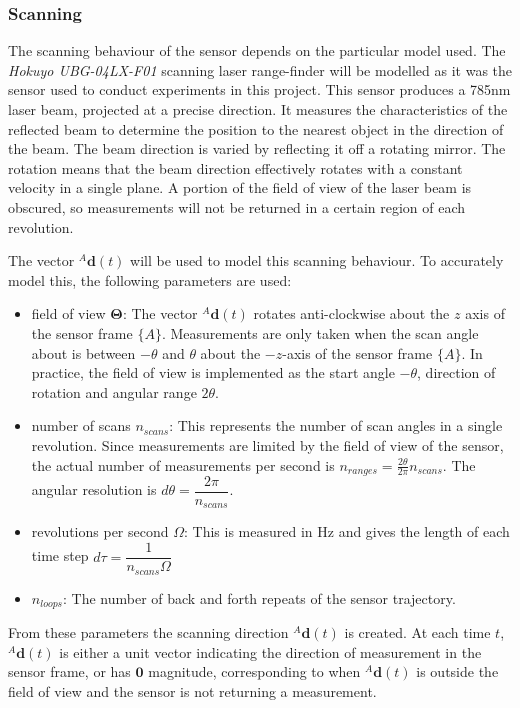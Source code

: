 \subsubsection{Scanning} \label{sec:scanmodel}
The scanning behaviour of the sensor depends on the particular model used. The \textit{Hokuyo UBG-04LX-F01} scanning laser range-finder will be modelled as it was the sensor used to conduct experiments in this project. This sensor produces a 785nm laser beam, projected at a precise direction. It measures the characteristics of the reflected beam to determine the position to the nearest object in the direction of the beam. The beam direction is varied by reflecting it off a rotating mirror. The rotation means that the beam direction effectively rotates with a constant velocity in a single plane. A portion of the field of view of the laser beam is obscured, so measurements will not be returned in a certain region of each revolution.

The vector ${^{A}\mathbf{d}(t)}$ will be used to model this scanning behaviour.
To accurately model this, the following parameters are used:
\begin{itemize}
\item field of view $\mathbf{\Theta}$: The vector ${^{A}\mathbf{d}(t)}$ rotates anti-clockwise about the $z$ axis of the sensor frame $\{A\}$. Measurements are only taken when the scan angle about is between $-\theta$ and $\theta$ about the $-z$-axis of the sensor frame $\{A\}$. In practice, the field of view is implemented as the start angle $-\theta$, direction of rotation and angular range $2\theta$.
\item number of scans $n_{scans}$: This represents the number of scan angles in a single revolution. Since measurements are limited by the field of view of the sensor, the actual number of measurements per second is $n_{ranges} = \frac{2\theta}{2\pi}n_{scans}$. The angular resolution is $d\theta = \dfrac{2\pi}{n_{scans}}$.
\item revolutions per second $\Omega$: This is measured in Hz and gives the length of each time step $d\tau = \dfrac{1}{n_{scans}\Omega}$
\item $n_{loops}$: The number of back and forth repeats of the sensor trajectory.
\end{itemize}
From these parameters the scanning direction ${^{A}\mathbf{d}(t)}$ is created. At each time $t$, ${^{A}\mathbf{d}(t)}$ is either a unit vector indicating the direction of measurement in the sensor frame, or has $\mathbf{0}$ magnitude, corresponding to when ${^{A}\mathbf{d}(t)}$ is outside the field of view and the sensor is not returning a measurement.

